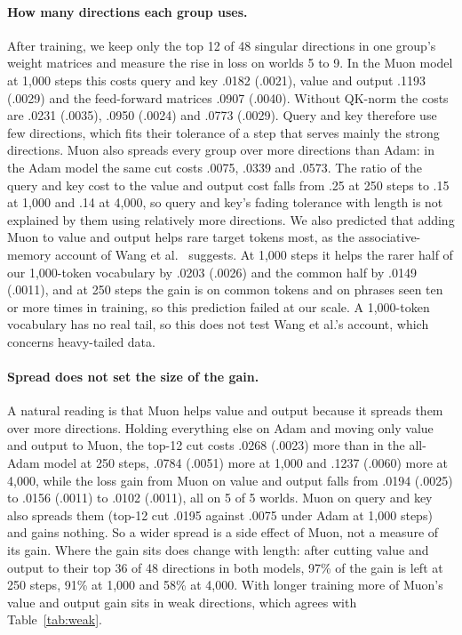 \documentclass[11pt]{article}
\begin{document}
\paragraph{How many directions each group uses.} After training, we keep only the top 12 of 48 singular directions in one group's weight matrices and measure the rise in loss on worlds 5 to 9. In the Muon model at 1,000 steps this costs query and key .0182 (.0021), value and output .1193 (.0029) and the feed-forward matrices .0907 (.0040). Without QK-norm the costs are .0231 (.0035), .0950 (.0024) and .0773 (.0029). Query and key therefore use few directions, which fits their tolerance of a step that serves mainly the strong directions. Muon also spreads every group over more directions than Adam: in the Adam model the same cut costs .0075, .0339 and .0573. The ratio of the query and key cost to the value and output cost falls from .25 at 250 steps to .15 at 1,000 and .14 at 4,000, so query and key's fading tolerance with length is not explained by them using relatively more directions. We also predicted that adding Muon to value and output helps rare target tokens most, as the associative-memory account of Wang et al.~\cite{wang2025tail} suggests. At 1,000 steps it helps the rarer half of our 1,000-token vocabulary by .0203 (.0026) and the common half by .0149 (.0011), and at 250 steps the gain is on common tokens and on phrases seen ten or more times in training, so this prediction failed at our scale. A 1,000-token vocabulary has no real tail, so this does not test Wang et al.'s account, which concerns heavy-tailed data.

\paragraph{Spread does not set the size of the gain.} A natural reading is that Muon helps value and output because it spreads them over more directions. Holding everything else on Adam and moving only value and output to Muon, the top-12 cut costs .0268 (.0023) more than in the all-Adam model at 250 steps, .0784 (.0051) more at 1,000 and .1237 (.0060) more at 4,000, while the loss gain from Muon on value and output falls from .0194 (.0025) to .0156 (.0011) to .0102 (.0011), all on 5 of 5 worlds. Muon on query and key also spreads them (top-12 cut .0195 against .0075 under Adam at 1,000 steps) and gains nothing. So a wider spread is a side effect of Muon, not a measure of its gain. Where the gain sits does change with length: after cutting value and output to their top 36 of 48 directions in both models, 97\% of the gain is left at 250 steps, 91\% at 1,000 and 58\% at 4,000. With longer training more of Muon's value and output gain sits in weak directions, which agrees with Table~\ref{tab:weak}.
\end{document}
